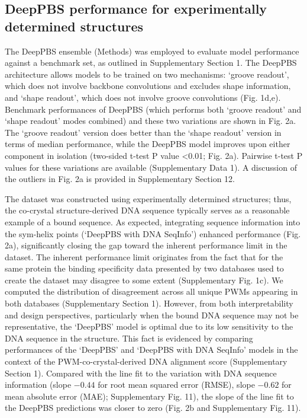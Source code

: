 \subsection{DeepPBS performance for experimentally determined structures}
The DeepPBS ensemble (Methods) was employed to evaluate model performance against a benchmark set, as outlined in Supplementary Section 1. The DeepPBS architecture allows models to be trained on two mechanisms: ‘groove readout’, which does not involve backbone convolutions and excludes shape information, and ‘shape readout’, which does not involve groove convolutions (Fig. 1d,e). Benchmark performances of DeepPBS (which performs both ‘groove readout’ and ‘shape readout’ modes combined) and these two variations are shown in Fig. 2a. The ‘groove readout’ version does better than the ‘shape readout’ version in terms of median performance, while the DeepPBS model improves upon either component in isolation (two-sided t-test P value <0.01; Fig. 2a). Pairwise t-test P values for these variations are available (Supplementary Data 1). A discussion of the outliers in Fig. 2a is provided in Supplementary Section 12.
\par
The dataset was constructed using experimentally determined structures; thus, the co-crystal structure-derived DNA sequence typically serves as a reasonable example of a bound sequence. As expected, integrating sequence information into the sym-helix points (‘DeepPBS with DNA SeqInfo’) enhanced performance (Fig. 2a), significantly closing the gap toward the inherent performance limit in the dataset. The inherent performance limit originates from the fact that for the same protein the binding specificity data presented by two databases \citep{Jaime2022, kulakovskiy2018hocomoco} used to create the dataset may disagree to some extent (Supplementary Fig. 1c). We computed the distribution of disagreement across all unique PWMs appearing in both databases (Supplementary Section 1). However, from both interpretability and design perspectives, particularly when the bound DNA sequence may not be representative, the ‘DeepPBS’ model is optimal due to its low sensitivity to the DNA sequence in the structure. This fact is evidenced by comparing performances of the ‘DeepPBS’ and ‘DeepPBS with DNA SeqInfo’ models in the context of the PWM-co-crystal-derived DNA alignment score (Supplementary Section 1). Compared with the line fit to the variation with DNA sequence information (slope $-0.44$ for root mean squared error (RMSE), slope $-0.62$ for mean absolute error (MAE); Supplementary Fig. 11), the slope of the line fit to the DeepPBS predictions was closer to zero (Fig. 2b and Supplementary Fig. 11).
